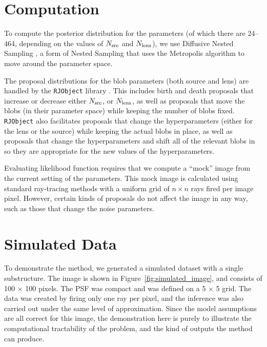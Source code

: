 \documentclass[useAMS,usenatbib]{mn2e}
\begin{document}
\section{Computation}
To compute the posterior distribution for the parameters
(of which there are 24--464, depending on the values of $N_{\rm src}$ and
$N_{\rm lens}$), we use Diffusive Nested Sampling \citep{dnest}, a form
of Nested Sampling \citep{skilling} that uses the Metropolis algorithm
to move around the parameter space.

The proposal distributions for the blob parameters (both source and lens) are
handled by the {\tt RJObject} library \citep{rjobject}. This includes
birth and death proposals that increase or decrease either $N_{\rm src}$,
or $N_{\rm lens}$, as well as proposals that move the blobs (in their parameter
space) while keeping the number of blobs fixed. {\tt RJObject} also
facilitates proposals that change the hyperparameters (either for the lens
or the source) while keeping the actual blobs in place, as well as proposals
that change the hyperparameters and shift all of the relevant blobs in
so they are appropriate for the new values of the hyperparameters.

Evaluating likelihood function requires that we compute a ``mock'' image from
the current setting of the parameters. This mock image is calculated using
standard ray-tracing methods with a uniform grid of $n \times n$ rays
fired per image pixel. However, certain kinds of proposals do not affect the
image in any way, such as those that change the noise parameters.

\section{Simulated Data}
To demonstrate the method, we generated a simulated dataset with a single
substructure. The image is shown in Figure~\ref{fig:simulated_image}, and
consists of 100 $\times$ 100 pixels. The PSF was compact and was
defined on a 5 $\times$ 5 grid. The data was created by firing only one ray
per pixel, and the inference was also carried out under the same level of
approximation. Since the model assumptions are all correct for this image, the
demonstration here is purely to illustrate the computational tractability of
the problem, and the kind of outputs the method can produce.
\end{document}
